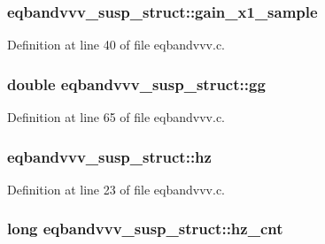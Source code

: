 \subsubsection[{\texorpdfstring{gain\+\_\+x1\+\_\+sample}{gain_x1_sample}}]{ eqbandvvv\+\_\+susp\+\_\+struct\+::gain\+\_\+x1\+\_\+sample}\hypertarget{structeqbandvvv__susp__struct_a9504c6ff2a94189ff83a54234e8581bf}{}\label{structeqbandvvv__susp__struct_a9504c6ff2a94189ff83a54234e8581bf}


Definition at line 40 of file eqbandvvv.\+c.

\subsubsection[{\texorpdfstring{gg}{gg}}]{\setlength{\rightskip}{0pt plus 5cm}double eqbandvvv\+\_\+susp\+\_\+struct\+::gg}\hypertarget{structeqbandvvv__susp__struct_a9f3181b3620300ddbc514e8adf46795e}{}\label{structeqbandvvv__susp__struct_a9f3181b3620300ddbc514e8adf46795e}


Definition at line 65 of file eqbandvvv.\+c.

\subsubsection[{\texorpdfstring{hz}{hz}}]{ eqbandvvv\+\_\+susp\+\_\+struct\+::hz}\hypertarget{structeqbandvvv__susp__struct_a5854534a1c7512dfe3ef4d5f93c6a565}{}\label{structeqbandvvv__susp__struct_a5854534a1c7512dfe3ef4d5f93c6a565}


Definition at line 23 of file eqbandvvv.\+c.

\subsubsection[{\texorpdfstring{hz\+\_\+cnt}{hz_cnt}}]{\setlength{\rightskip}{0pt plus 5cm}long eqbandvvv\+\_\+susp\+\_\+struct\+::hz\+\_\+cnt}\hypertarget{structeqbandvvv__susp__struct_a9e6ed1c95e00b79f6e11ca280235ac8c}{}\label{structeqbandvvv__susp__struct_a9e6ed1c95e00b79f6e11ca280235ac8c}


